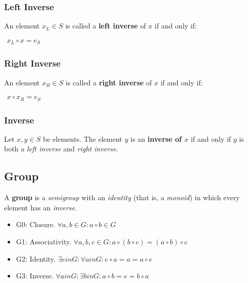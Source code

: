\subsubsection{Left Inverse}
An element $x_L \in S$ is called a \textbf{left inverse} of $x$ if and
only if:

\begin{math}
  \begin{array}{c}
    x_L \circ x = e_S
  \end{array}
\end{math}


\subsubsection{Right Inverse}
An element $x_R \in S$ is called a \textbf{right inverse} of $x$ if and
only if:

\begin{math}
  \begin{array}{c}
    x \circ x_R = e_S
  \end{array}
\end{math}

\subsubsection{Inverse}
Let $x , y \in S $ be elements. The element $y$ is an \textbf{inverse
  of $x$} if and only if $y$ is both a \textit{left inverse} and
\textit{right inverse}.


\subsection{Group}

A \textbf{group} is a \textit{semigroup} with an \textit{identity}
(that is, a \textit{monoid}) in which every element has an
\textit{inverse}.

\begin{itemize}
\item G0: Closure. $ \forall a, b \in G: a \circ b \in G$
\item G1: Associativity. $ \forall a, b, c \in G: a \circ (b \circ c) = (a \circ b) \circ c $
\item G2: Identity. $\exists e in G : \forall a in G: e \circ a = a = a \circ e $
\item G3: Inverse. $\forall a in G: \exists b in G: a \circ b = e = b \circ a$
\end{itemize}







